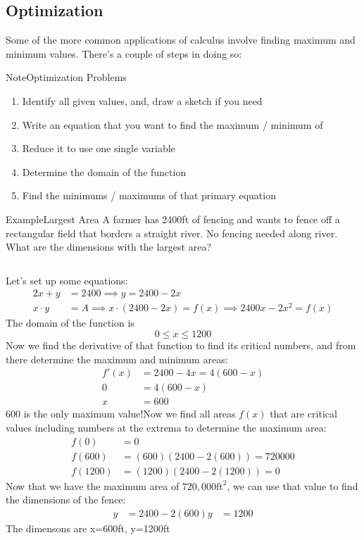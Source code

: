 \documentclass{MathNotes}
\newenvironment{example}[1]{\begin{BlueBox}{Example}{#1}}{\end{BlueBox}}
\newenvironment{note}[1]{\begin{YellowBox}{Note}{#1}}{\end{YellowBox}}
\newcommand{\bl}{
	\newline$ $\newline
}
\begin{document}
\subsection{Optimization}
Some of the more common applications of calculus involve finding maximum and
minimum values. There's a couple of steps in doing so:
\begin{note}{Optimization Problems}
	\begin{enumerate}
		\item Identify all given values, and, draw a sketch if you need
		\item Write an equation that you want to find the maximum / minimum of
		\item Reduce it to use one single variable
		\item Determine the domain of the function
		\item Find the minimums / maximums of that primary equation
	\end{enumerate}
\end{note}
\begin{example}{Largest Area}
	A farmer has 2400ft of fencing and wants to fence off a rectangular field that
	borders a straight river. No fencing needed along river. What are the dimensions
	with the largest area?
	\bl
	Let's set up some equations:
	\begin{align*}
		2x+y     & =2400\implies y=2400-2x                                 \\
		x\cdot y & =A\implies x\cdot(2400-2x)=f(x)\implies 2400x-2x^2=f(x)
	\end{align*}
	The domain of the function is $$0\leq x\leq 1200$$
	Now we find the derivative of that function to find its critical numbers, and
	from there determine the maximum and minimum areas:
	\begin{align*}
		f'(x) & =2400-4x=4(600-x) \\
		0     & =4(600-x)         \\
		x     & =600
	\end{align*}
	600 is the only maximum value!\newline Now we find all areas $f(x)$ that are
	critical values including numbers at the extrema to determine the maximum area:
	\begin{align*}
		f(0)    & =0                         \\
		f(600)  & =(600)(2400-2(600))=720000 \\
		f(1200) & =(1200)(2400-2(1200))=0
	\end{align*}
	Now that we have the maximum area of $720,000\text{ft}^2$, we can use that value to find the dimensions of the fence:
	\begin{align*}
		y & =2400-2(600)
		y & =1200
	\end{align*}
	The dimensons are x=600ft, y=1200ft
\end{example}
\end{document}
